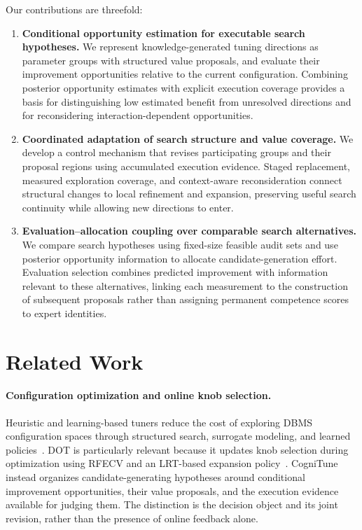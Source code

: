 Our contributions are threefold:
\begin{enumerate}
    \item \textbf{Conditional opportunity estimation for executable search hypotheses.}
    We represent knowledge-generated tuning directions as parameter groups with structured value proposals, and evaluate their improvement opportunities relative to the current configuration. Combining posterior opportunity estimates with explicit execution coverage provides a basis for distinguishing low estimated benefit from unresolved directions and for reconsidering interaction-dependent opportunities.

    \item \textbf{Coordinated adaptation of search structure and value coverage.}
    We develop a control mechanism that revises participating groups and their proposal regions using accumulated execution evidence. Staged replacement, measured exploration coverage, and context-aware reconsideration connect structural changes to local refinement and expansion, preserving useful search continuity while allowing new directions to enter.

    \item \textbf{Evaluation--allocation coupling over comparable search alternatives.}
    We compare search hypotheses using fixed-size feasible audit sets and use posterior opportunity information to allocate candidate-generation effort. Evaluation selection combines predicted improvement with information relevant to these alternatives, linking each measurement to the construction of subsequent proposals rather than assigning permanent competence scores to expert identities.
\end{enumerate}

\section{Related Work}

\paragraph{Configuration optimization and online knob selection.}
Heuristic and learning-based tuners reduce the cost of exploring DBMS configuration spaces through structured search, surrogate modeling, and learned policies~\cite{bestconfig,opentuner,ottertune,cdbtune}. DOT is particularly relevant because it updates knob selection during optimization using RFECV and an LRT-based expansion policy~\cite{dot}. CogniTune instead organizes candidate-generating hypotheses around conditional improvement opportunities, their value proposals, and the execution evidence available for judging them. The distinction is the decision object and its joint revision, rather than the presence of online feedback alone.

